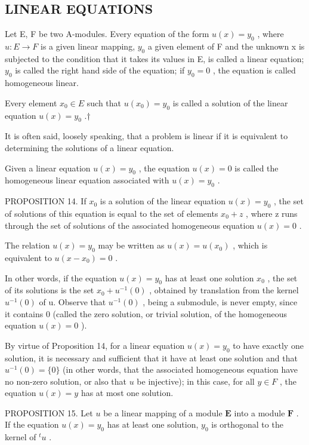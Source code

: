 \subsection{LINEAR EQUATIONS}

Let E, F be two A-modules. Every equation of the form \(u(x) = y_{0}\) , where \(u: E \to F\) is a given linear mapping, \(y_{0}\) a given element of F and the unknown x is subjected to the condition that it takes its values in E, is called a linear equation; \(y_{0}\) is called the right hand side of the equation; if \(y_{0} = 0\) , the equation is called homogeneous linear.

Every element \(x_{0} \in E\) such that \(u(x_{0}) = y_{0}\) is called a solution of the linear equation \(u(x) = y_{0}\) .†

It is often said, loosely speaking, that a problem is linear if it is equivalent to determining the solutions of a linear equation.

Given a linear equation \(u(x) = y_{0}\) , the equation \(u(x) = 0\) is called the homogeneous linear equation associated with \(u(x) = y_{0}\) .

PROPOSITION 14. If \(x_{0}\) is a solution of the linear equation \(u(x) = y_{0}\) , the set of solutions of this equation is equal to the set of elements \(x_{0} + z\) , where z runs through the set of solutions of the associated homogeneous equation \(u(x) = 0\) .

The relation \(u(x) = y_0\) may be written as \(u(x) = u(x_0)\) , which is equivalent to \(u(x - x_0) = 0\) .

In other words, if the equation \(u(x) = y_{0}\) has at least one solution \(x_{0}\) , the set of its solutions is the set \(x_{0} + u^{-1}(0)\) , obtained by translation from the kernel \(u^{-1}(0)\) of u. Observe that \(u^{-1}(0)\) , being a submodule, is never empty, since it contains 0 (called the zero solution, or trivial solution, of the homogeneous equation \(u(x) = 0\) ).

By virtue of Proposition 14, for a linear equation \(u(x) = y_0\) to have exactly one solution, it is necessary and sufficient that it have at least one solution and that \(u^{-1}(0) = \{0\}\) (in other words, that the associated homogeneous equation have no non-zero solution, or also that \(u\) be injective); in this case, for all \(y \in F\) , the equation \(u(x) = y\) has at most one solution.

PROPOSITION 15. Let \(u\) be a linear mapping of a module \(\mathbf{E}\) into a module \(\mathbf{F}\) . If the equation \(u(x) = y_0\) has at least one solution, \(y_0\) is orthogonal to the kernel of \(^t u\) .


